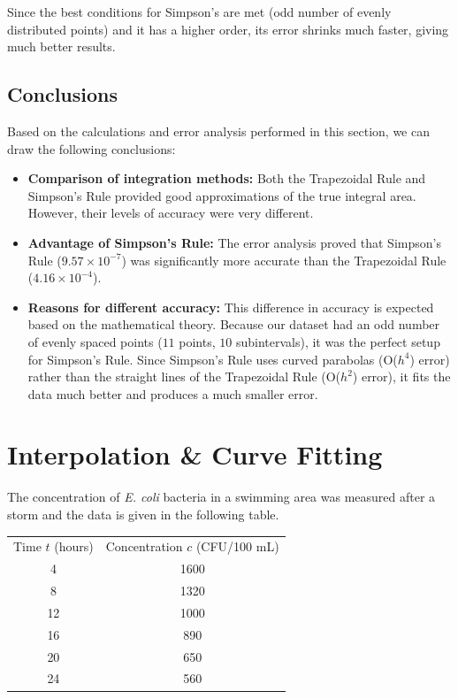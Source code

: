 \documentclass{article}
\begin{document}
Since the best conditions for Simpson's are met (odd number of evenly distributed points) and it has a higher order, its error shrinks much faster, giving much better results.

\subsection{Conclusions}

Based on the calculations and error analysis performed in this section, we can draw the following conclusions:

\begin{itemize}
    \item \textbf{Comparison of integration methods:} Both the Trapezoidal Rule and Simpson's Rule provided good approximations of the true integral area. However, their levels of accuracy were very different.
    
    \item \textbf{Advantage of Simpson's Rule:} The error analysis proved that Simpson's Rule ($9.57 \times 10^{-7}$) was significantly more accurate than the Trapezoidal Rule ($4.16 \times 10^{-4}$).
    
    \item \textbf{Reasons for different accuracy:} This difference in accuracy is expected based on the mathematical theory. Because our dataset had an odd number of evenly spaced points ($11$ points, $10$ subintervals), it was the perfect setup for Simpson's Rule. Since Simpson's Rule uses curved parabolas (O($h^4$) error) rather than the straight lines of the Trapezoidal Rule (O($h^2$) error), it fits the data much better and produces a much smaller error.
\end{itemize}

\newpage


\section{Interpolation \& Curve Fitting}

The concentration of \textit{E. coli} bacteria in a swimming area was measured after a storm and the data is given in the following table.

\begin{table}[h!]
    \centering
    \begin{tabular}{cc}
        Time $t$ (hours) & Concentration $c$ (CFU/100 mL) \\
        4  & 1600 \\
        8  & 1320 \\
        12 & 1000 \\
        16 & 890  \\
        20 & 650  \\
        24 & 560  \\
    \end{tabular}
\end{table}
\end{document}
